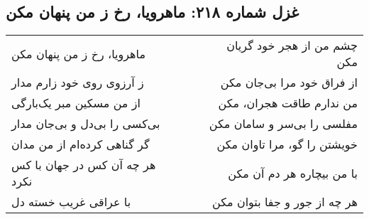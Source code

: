 \begin{center}
\section*{غزل شماره ۲۱۸: ماهرویا، رخ ز من پنهان مکن}
\label{sec:218}
\begin{longtable}{l p{0.5cm} r}
ماهرویا، رخ ز من پنهان مکن
&&
چشم من از هجر خود گریان مکن
\\
ز آرزوی روی خود زارم مدار
&&
از فراق خود مرا بی‌جان مکن
\\
از من مسکین مبر یک‌بارگی
&&
من ندارم طاقت هجران، مکن
\\
بی‌کسی را بی‌دل و بی‌جان مدار
&&
مفلسی را بی‌سر و سامان مکن
\\
گر گناهی کرده‌ام از من مدان
&&
خویشتن را گو، مرا تاوان مکن
\\
هر چه آن کس در جهان با کس نکرد
&&
با من بیچاره هر دم آن مکن
\\
با عراقی غریب خسته دل
&&
هر چه از جور و جفا بتوان مکن
\\
\end{longtable}
\end{center}
